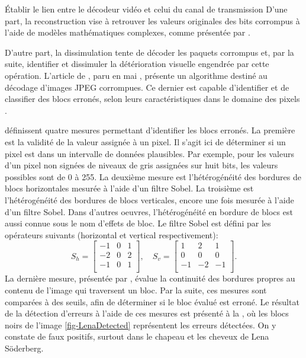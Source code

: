 \begin{section}{Établir le lien entre le décodeur vidéo et celui du canal de
transmission}
D'une part, la reconstruction vise à retrouver les valeurs originales des bits
corrompus à l'aide de modèles mathématiques complexes, comme présentée par
\citet{Duhamel2010}.

D'autre part, la dissimulation tente de décoder les paquets corrompus et, par la
suite, identifier et dissimuler la détérioration visuelle engendrée par cette
opération. L'article de \citeauthor{Ye2003}, paru en mai \citeyear{Ye2003},
présente un algorithme destiné au décodage d'images JPEG corrompues. Ce dernier
est capable d'identifier et de classifier des blocs erronés, selon leurs
caractéristiques dans le domaine des pixels \citep{Ye2003}.

\citeauthor{Ye2003} définissent quatre mesures permettant d'identifier les blocs
erronés. La première est la validité de la valeur assignée à un pixel. Il s'agit
ici de déterminer si un pixel est dans un intervalle de données plausibles. Par
exemple, pour les valeurs d'un pixel non signées de niveaux de gris assignées
sur huit bits, les valeurs possibles sont de 0 à 255. La deuxième mesure est
l'hétérogénéité des bordures de blocs horizontales mesurée à l'aide d'un filtre
Sobel. La troisième est l'hétérogénéité des bordures de blocs verticales, encore
une fois mesurée à l'aide d'un filtre Sobel. Dans d'autres oeuvres,
l'hétérogénéité en bordure de blocs est aussi connue sous le nom d'effets de
bloc. Le filtre Sobel est défini par les opérateurs suivants (horizontal et
vertical respectivement):
\begin{equation}
S_h =
\begin{bmatrix}
-1 & 0 & 1\\
-2 & 0 & 2\\
-1 & 0 & 1\\
\end{bmatrix}, \quad
S_v =
\begin{bmatrix}
1 & 2 & 1\\
0 & 0 & 0\\
-1 & -2 & -1\\
\end{bmatrix}.
\end{equation}
La dernière mesure, présentée par \citeauthor{Ye2003}, évalue la continuité des
bordures propres au contenu de l'image qui traversent un bloc. Par la suite, ces
mesures sont comparées à des seuils, afin de déterminer si le bloc évalué est
erroné. Le résultat de la détection d'erreurs à l'aide de ces mesures est
présenté à la , où les blocs noirs de l'image
\ref{fig-LenaDetected} représentent les erreurs détectées. On y constate de
faux positifs, surtout dans le chapeau et les cheveux de Lena Söderberg.


\end{section}
